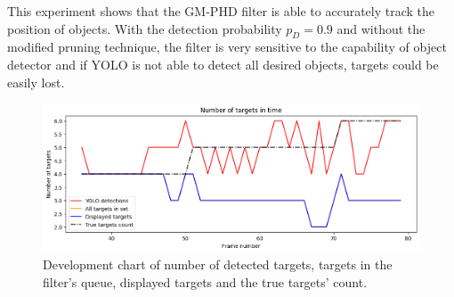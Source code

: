 This experiment shows that the GM-PHD filter is able to accurately track the position of objects. With the detection
probability $p_D = 0.9$ and without the modified pruning technique, the filter is very sensitive to the capability of
object detector and if YOLO is not able to detect all desired objects, targets could be easily lost.

\begin{figure}[H]
    \centering
    \includegraphics[width=\linewidth]{../../../experiments/E1/V1/noPd/staticPd_det}
    \caption{Development chart of number of detected targets, targets in the filter's queue, displayed targets and
    the true
    targets' count.}
    \label{gr:E1-V1-S0}
\end{figure}


